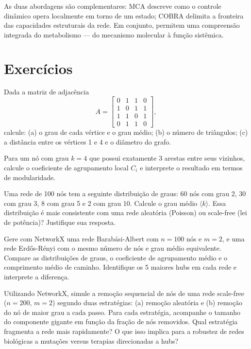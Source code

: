 As duas abordagens são complementares: MCA descreve como o controle dinâmico opera
localmente em torno de um estado; COBRA delimita a fronteira das capacidades estruturais
da rede. Em conjunto, permitem uma compreensão integrada do metabolismo --- do mecanismo
molecular à função sistêmica.

\section{Exercícios}

\begin{exercicio}
Dada a matriz de adjacência
\[
A = \begin{bmatrix}
0 & 1 & 1 & 0 \\
1 & 0 & 1 & 1 \\
1 & 1 & 0 & 1 \\
0 & 1 & 1 & 0
\end{bmatrix},
\]
calcule: (a) o grau de cada vértice e o grau médio; (b) o número de triângulos; (c) a
distância entre os vértices 1 e 4 e o diâmetro do grafo.
\end{exercicio}

\begin{exercicio}
Para um nó com grau $k = 4$ que possui exatamente 3 arestas entre seus vizinhos,
calcule o coeficiente de agrupamento local $C_i$ e interprete o resultado em termos
de modularidade.
\end{exercicio}

\begin{exercicio}
Uma rede de 100 nós tem a seguinte distribuição de graus: 60 nós com grau 2, 30 com
grau 3, 8 com grau 5 e 2 com grau 10. Calcule o grau médio $\langle k \rangle$. Essa
distribuição é mais consistente com uma rede aleatória (Poisson) ou scale-free (lei de
potência)? Justifique sua resposta.
\end{exercicio}

\begin{exercicio}[NetworkX]
Gere com NetworkX uma rede Barabási-Albert com $n = 100$ nós e $m = 2$, e uma rede
Erdős-Rényi com o mesmo número de nós e grau médio equivalente. Compare as distribuições
de graus, o coeficiente de agrupamento médio e o comprimento médio de caminho. Identifique
os 5 maiores hubs em cada rede e interprete a diferença.
\end{exercicio}

\begin{exercicio}[Robustez]
Utilizando NetworkX, simule a remoção sequencial de nós de uma rede scale-free ($n = 200$,
$m = 2$) segundo duas estratégias: (a) remoção aleatória e (b) remoção do nó de maior
grau a cada passo. Para cada estratégia, acompanhe o tamanho do componente gigante em
função da fração de nós removidos. Qual estratégia fragmenta a rede mais rapidamente?
O que isso implica para a robustez de redes biológicas a mutações versus terapias
direcionadas a hubs?
\end{exercicio}


